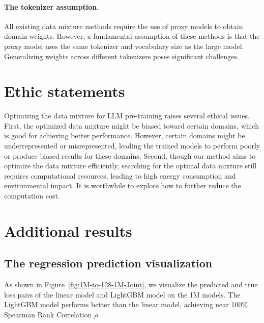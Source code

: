 \paragraph{The tokenizer assumption.}

All existing data mixture methods require the use of proxy models to obtain domain weights. However, a fundamental assumption of these methods is that the proxy model uses the same tokenizer and vocabulary size as the large model. Generalizing weights across different tokenizers poses significant challenges.


\section{Ethic statements}
\label{sec:ethic}
Optimizing the data mixture for LLM pre-training raises several ethical issues. 
First, the optimized data mixture might be biased toward certain domains, which is good for achieving better performance. However, certain domains might be underrepresented or misrepresented, leading the trained models to perform poorly or produce biased results for these domains.
Second, though our method aims to optimize the data mixture efficiently, searching for the optimal data mixture still requires computational resources, leading to high energy consumption and environmental impact.
It is worthwhile to explore how to further reduce the computation cost. 



\clearpage
\section{Additional results}

\subsection{The regression prediction visualization}

As shown in Figure~\ref{fig:1M-to-128-1M-Joint}, we visualize the predicted and true loss pairs of the linear model and LightGBM model on the 1M models. 
The LightGBM model performs better than the linear model, achieving near 100\% Spearman Rank Correlation $\rho$.

